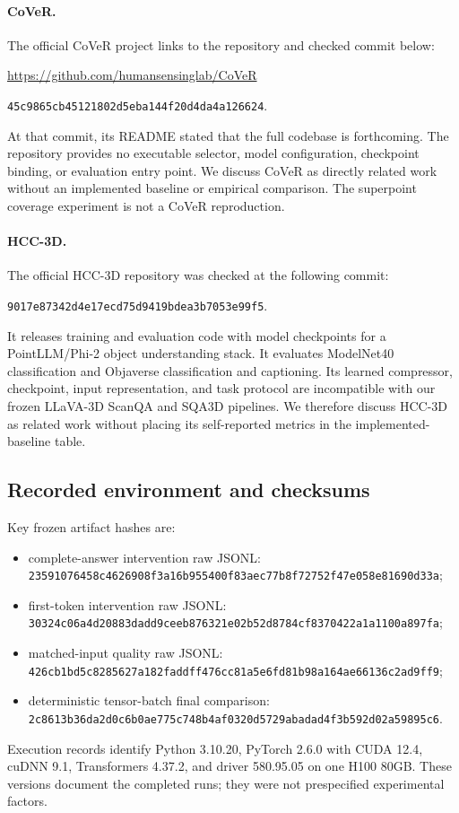 \paragraph{CoVeR.} The official CoVeR project links to the repository and checked commit below:
{\raggedright\par\noindent
\url{https://github.com/humansensinglab/CoVeR}\par\noindent
\texttt{45c9865cb45121802d5e\allowbreak ba144f20d4da4a126624}.\par}
At that commit, its README stated that the full codebase is forthcoming. The repository provides no executable selector, model configuration, checkpoint binding, or evaluation entry point. We discuss CoVeR as directly related work without an implemented baseline or empirical comparison. The superpoint coverage experiment is not a CoVeR reproduction.

\paragraph{HCC-3D.} The official HCC-3D repository was checked at the following commit:
{\raggedright\par\noindent
\texttt{9017e87342d4e17ecd75\allowbreak d9419bdea3b7053e99f5}.\par}
It releases training and evaluation code with model checkpoints for a PointLLM/Phi-2 object understanding stack. It evaluates ModelNet40 classification and Objaverse classification and captioning. Its learned compressor, checkpoint, input representation, and task protocol are incompatible with our frozen LLaVA-3D ScanQA and SQA3D pipelines. We therefore discuss HCC-3D as related work without placing its self-reported metrics in the implemented-baseline table.

\subsection{Recorded environment and checksums}
Key frozen artifact hashes are:

\begin{itemize}
\item complete-answer intervention raw JSONL: \texttt{23591076458c4626}\allowbreak \texttt{908f3a16b955400f}\allowbreak \texttt{83aec77b8f72752f}\allowbreak \texttt{47e058e81690d33a};
\item first-token intervention raw JSONL: \texttt{30324c06a4d20883}\allowbreak \texttt{dadd9ceeb876321e}\allowbreak \texttt{02b52d8784cf8370}\allowbreak \texttt{422a1a1100a897fa};
\item matched-input quality raw JSONL: \texttt{426cb1bd5c828562}\allowbreak \texttt{7a182faddff476cc}\allowbreak \texttt{81a5e6fd81b98a16}\allowbreak \texttt{4ae66136c2ad9ff9};
\item deterministic tensor-batch final comparison: \texttt{2c8613b36da2d0c6}\allowbreak \texttt{b0ae775c748b4af0}\allowbreak \texttt{320d5729abadad4f}\allowbreak \texttt{3b592d02a59895c6}.
\end{itemize}

Execution records identify Python 3.10.20, PyTorch 2.6.0 with CUDA 12.4, cuDNN 9.1, Transformers 4.37.2, and driver 580.95.05 on one H100 80GB. These versions document the completed runs; they were not prespecified experimental factors.
